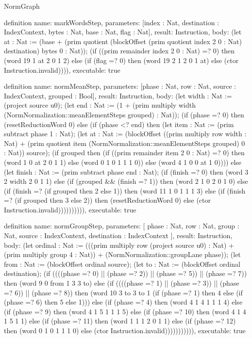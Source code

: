 \begin{lexlean}{NormGraph}
\begin{semanticmodule}
definition{
  name: markWordsStep,
  parameters: [index : Nat, destination : IndexContext, bytes : Nat, base : Nat, flag : Nat],
  result: Instruction,
  body: (let at : Nat := (base + (prim quotient (blockOffset (prim quotient index 2 0 : Nat) destination) bytes 0 : Nat)); (if ((prim remainder index 2 0 : Nat) =? 0) then (word 19 1 at 2 0 1 2) else (if (flag =? 0) then (word 19 2 1 2 0 1 at) else (ctor Instruction.invalid)))),
  executable: true
}

definition{
  name: normMeanStep,
  parameters: [phase : Nat, row : Nat, source : IndexContext, grouped : Bool],
  result: Instruction,
  body: (let width : Nat := (project source u0); (let end : Nat := (1 + (prim multiply width (NormNormalization::meanElementSteps grouped) : Nat)); (if (phase =? 0) then (resetReductionWord 0) else (if (phase <? end) then (let item : Nat := (prim subtract phase 1 : Nat); (let at : Nat := (blockOffset ((prim multiply row width : Nat) + (prim quotient item (NormNormalization::meanElementSteps grouped) 0 : Nat)) source); (if grouped then (if ((prim remainder item 2 0 : Nat) =? 0) then (word 1 0 at 2 0 1 1) else (word 0 1 0 1 1 1 0)) else (word 4 1 0 0 at 1 0)))) else (let finish : Nat := (prim subtract phase end : Nat); (if (finish =? 0) then (word 3 2 width 2 0 1 1) else (if (grouped && (finish =? 1)) then (word 2 1 0 2 0 1 0) else (if (finish =? (if grouped then 2 else 1)) then (word 11 1 0 1 1 1 3) else (if (finish =? (if grouped then 3 else 2)) then (resetReductionWord 0) else (ctor Instruction.invalid)))))))))),
  executable: true
}

definition{
  name: normGroupStep,
  parameters: [
    phase : Nat,
    row : Nat,
    group : Nat,
    source : IndexContext,
    destination : IndexContext
  ],
  result: Instruction,
  body: (let ordinal : Nat := (((prim multiply row (project source u0) : Nat) + (prim multiply group 4 : Nat)) + (NormNormalization::groupLane phase)); (let from : Nat := (blockOffset ordinal source); (let to : Nat := (blockOffset ordinal destination); (if ((((phase =? 0) || (phase =? 2)) || (phase =? 5)) || (phase =? 7)) then (word 9 0 from 1 3 3 to) else (if ((((phase =? 1) || (phase =? 3)) || (phase =? 6)) || (phase =? 8)) then (word 10 3 to 3 to 1 (if (phase =? 1) then 4 else (if (phase =? 6) then 5 else 1))) else (if (phase =? 4) then (word 4 1 4 1 1 1 4) else (if (phase =? 9) then (word 4 1 5 1 1 1 5) else (if (phase =? 10) then (word 4 1 4 1 5 1 1) else (if (phase =? 11) then (word 1 1 1 2 0 1 1) else (if (phase =? 12) then (word 0 1 0 1 1 1 0) else (ctor Instruction.invalid))))))))))),
  executable: true
}


\end{semanticmodule}
\end{lexlean}
